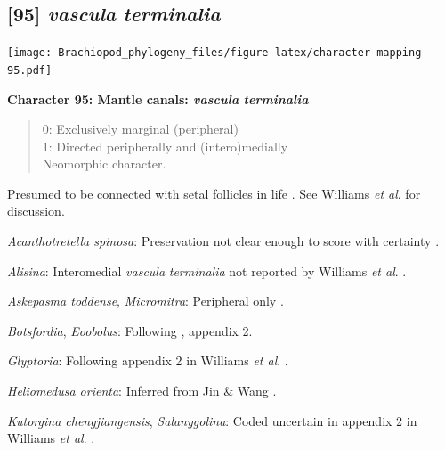 \documentclass[openany]{book}
\theoremstyle{definition}
\theoremstyle{definition}
\theoremstyle{definition}
\theoremstyle{remark}
\begin{document}
\subsection*{\texorpdfstring{{[}95{]} \emph{vascula}
\emph{terminalia}}{{[}95{]} vascula terminalia}}\label{vascula-terminalia}

\texttt{[image: Brachiopod\_phylogeny\_files/figure-latex/character-mapping-95.pdf]}

\textbf{Character 95: Mantle canals: \emph{vascula} \emph{terminalia}}

\begin{quote}
0: Exclusively marginal (peripheral)\\
1: Directed peripherally and (intero)medially\\
Neomorphic character.
\end{quote}

Presumed to be connected with setal follicles in life
\citep{Williams1998Thediversity}. See Williams \emph{et al}.
\citeyearpar{Williams2000LinguliformeaCraniiformea} for discussion.

\hypertarget{Acanthotretella_spinosa-coding-95}{}
\emph{Acanthotretella spinosa}: Preservation not clear enough to score
with certainty \citep{Holmer2006Aspinose}.

\hypertarget{Alisina-coding-95}{}
\emph{Alisina}: Interomedial \emph{vascula} \emph{terminalia} not
reported by Williams \emph{et al}.
\citeyearpar{Williams2000LinguliformeaCraniiformea}.

\hypertarget{Askepasma_toddense-coding-95}{}
\emph{Askepasma toddense}, \emph{Micromitra}: Peripheral only
\citep{Williams1998Thediversity, Williams2000LinguliformeaCraniiformea}.

\hypertarget{Botsfordia-coding-95}{}
\emph{Botsfordia}, \emph{Eoobolus}: Following
\citet{Williams1998Thediversity}, appendix 2.

\hypertarget{Glyptoria-coding-95}{}
\emph{Glyptoria}: Following appendix 2 in Williams \emph{et al}.
\citeyearpar{Williams1998Thediversity}.

\hypertarget{Heliomedusa_orienta-coding-95}{}
\emph{Heliomedusa orienta}: Inferred from Jin \& Wang
\citeyearpar{Jin1992Revisionof}.

\hypertarget{Kutorgina_chengjiangensis-coding-95}{}
\emph{Kutorgina chengjiangensis}, \emph{Salanygolina}: Coded uncertain
in appendix 2 in Williams \emph{et al}.
\citeyearpar{Williams1998Thediversity}.
\end{document}
